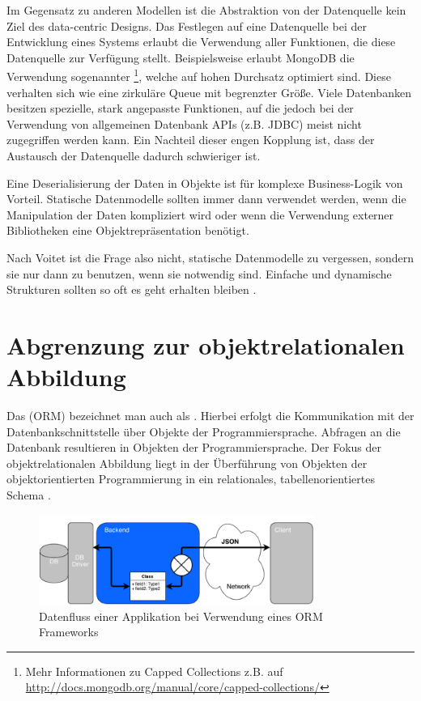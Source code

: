 Im Gegensatz zu anderen Modellen ist die Abstraktion von der Datenquelle kein Ziel des data-centric Designs. Das Festlegen auf eine Datenquelle bei der Entwicklung eines Systems erlaubt die Verwendung aller Funktionen, die diese Datenquelle zur Verfügung stellt. Beispielsweise erlaubt MongoDB die Verwendung sogenannter \footnote{Mehr Informationen zu Capped Collections z.B. auf \url{http://docs.mongodb.org/manual/core/capped-collections/}}, welche auf hohen Durchsatz optimiert sind. Diese verhalten sich wie eine zirkuläre Queue mit begrenzter Größe. Viele Datenbanken besitzen spezielle, stark angepasste Funktionen, auf die jedoch bei der Verwendung von allgemeinen Datenbank APIs (z.B. JDBC) meist nicht zugegriffen werden kann. Ein Nachteil dieser engen Kopplung ist, dass der Austausch der Datenquelle dadurch schwieriger ist. 

Eine Deserialisierung der Daten in Objekte ist für komplexe Business-Logik von Vorteil. Statische Datenmodelle sollten immer dann verwendet werden, wenn die Manipulation der Daten kompliziert wird oder wenn die Verwendung externer Bibliotheken eine Objektrepräsentation benötigt. 

Nach Voitet ist die Frage also nicht, statische Datenmodelle zu vergessen, sondern sie nur dann zu benutzen, wenn sie notwendig sind. Einfache und dynamische Strukturen sollten so oft es geht erhalten bleiben \cite{jctc}.

\section{Abgrenzung zur objektrelationalen Abbildung}
Das  (ORM) bezeichnet man auch als . Hierbei erfolgt die Kommunikation mit der Datenbankschnittstelle über Objekte der Programmiersprache. Abfragen an die Datenbank resultieren in Objekten der Programmiersprache. Der Fokus der objektrelationalen Abbildung liegt in der Überführung von Objekten der objektorientierten Programmierung in ein relationales, tabellenorientiertes Schema \cite{wambler}. 

\begin{figure}[h]   
  \centering     
  \includegraphics[width=0.8\textwidth]{img/orm.png}  
   \caption{Datenfluss einer Applikation bei Verwendung eines ORM Frameworks}   
  \label{fig:orm} 
\end{figure}


